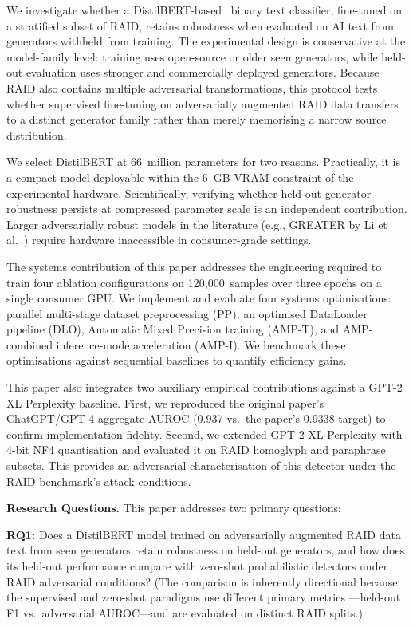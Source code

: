 \documentclass[conference]{IEEEtran}
\begin{document}
We investigate whether a DistilBERT-based~\cite{sanh2019} binary text
classifier, fine-tuned on a stratified subset of RAID, retains robustness
when evaluated on AI text from generators withheld from training. The
experimental design is conservative at the model-family level: training uses
open-source or older seen generators, while held-out evaluation uses stronger
and commercially deployed generators. Because RAID also contains multiple
adversarial transformations, this protocol tests whether supervised
fine-tuning on adversarially augmented RAID data transfers to a distinct
generator family rather than merely memorising a narrow source distribution.

We select DistilBERT at 66~million parameters for two reasons. Practically,
it is a compact model deployable within the 6~GB VRAM constraint of
the experimental hardware. Scientifically, verifying whether held-out-generator
robustness persists at compressed parameter scale is an independent
contribution. Larger adversarially robust models in the literature (e.g.,
GREATER by Li et al.~\cite{li2025}) require hardware inaccessible in
consumer-grade settings.

The systems contribution of this paper addresses the engineering required to
train four ablation configurations on 120,000~samples over three epochs on a
single consumer GPU. We implement and evaluate four systems optimisations:
parallel multi-stage dataset preprocessing (PP),
an optimised DataLoader pipeline (DLO), Automatic Mixed Precision training (AMP-T),
and AMP-combined inference-mode acceleration (AMP-I). We benchmark these
optimisations against sequential baselines to quantify efficiency gains.

This paper also integrates two auxiliary empirical contributions against a
GPT-2 XL Perplexity baseline. First, we reproduced the original paper's
ChatGPT/GPT-4 aggregate AUROC (0.937 vs.\ the paper's 0.9338 target) to
confirm implementation fidelity. Second, we extended GPT-2 XL Perplexity with
4-bit NF4 quantisation and evaluated it on RAID homoglyph and paraphrase
subsets. This provides an adversarial characterisation of this
detector under the RAID benchmark's attack conditions.

\smallskip
\noindent\textbf{Research Questions.} This paper addresses two primary
questions:

\smallskip
\noindent\textbf{RQ1:} Does a DistilBERT model trained on adversarially augmented RAID data
text from seen generators retain robustness on held-out generators, and how
does its held-out performance compare with zero-shot probabilistic detectors
under RAID adversarial conditions? (The comparison is inherently directional
because the supervised and zero-shot paradigms use different primary metrics
---held-out F1 vs.\ adversarial AUROC---and are evaluated on distinct RAID splits.)
\end{document}
